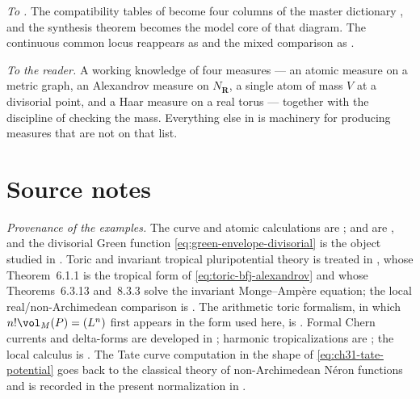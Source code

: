\emph{To .}  The compatibility tables of
 become four columns of the master dictionary
, and the synthesis theorem
 becomes the model core
 of that diagram.  The continuous common locus
reappears as  and the mixed
comparison as .

\emph{To the reader.}  A working knowledge of four measures --- an atomic
measure on a metric graph, an Alexandrov measure on \(N_\mathbf R\), a
single atom of mass \(V\) at a divisorial point, and a Haar measure on a real
torus --- together with the discipline of checking the mass.  Everything
else in  is machinery for producing measures that are not on
that list.

\section*{Source notes}

\emph{Provenance of the examples.}  The curve and atomic calculations are
\cite[\S\S8--9]{BFJ15};  and
 are \cite[Lemma~8.5 and
Proposition~8.6]{BFJ15}, and the divisorial Green function
\eqref{eq:green-envelope-divisorial} is the object studied in
\cite{BJGreen24}.  Toric and invariant tropical pluripotential theory is
treated in \cite{BGJKK25}, whose Theorem~6.1.1 is the tropical form of
\eqref{eq:toric-bfj-alexandrov} and whose Theorems~6.3.13 and~8.3.3 solve
the invariant Monge--Amp\`ere equation; the local real/non-Archimedean
comparison is \cite{Vil20}.  The arithmetic toric formalism, in which
\(n!\vol_M(P)=(L^n)\) first appears in the form used here, is
\cite{BGPS14}.  Formal Chern currents and delta-forms are developed in
\cite{GK17,GK19}; harmonic tropicalizations are \cite{GJR26}; the local
calculus is \cite{CLD25}.  The Tate curve computation in the shape of
\eqref{eq:ch31-tate-potential} goes back to the classical theory of
non-Archimedean N\'eron functions and is recorded in the present
normalization in .

